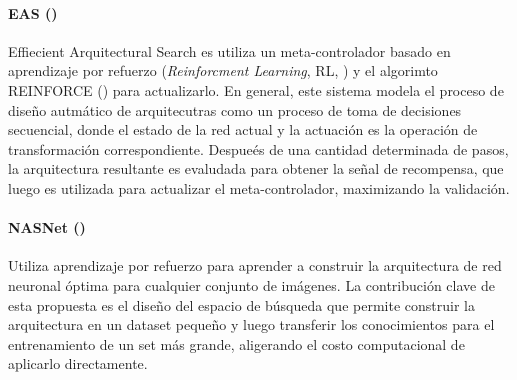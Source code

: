 
\paragraph*{EAS (\cite{cai2018efficient})} Effiecient Arquitectural Search es utiliza un meta-controlador basado en aprendizaje por refuerzo (\textit{Reinforcment Learning}, RL, \cite{kaelbling1996reinforcement}) y el algorimto REINFORCE (\cite{williams1992simple}) para actualizarlo. En general, este sistema modela el proceso de dise\~no autm\'atico de arquitecutras como un proceso de toma de decisiones secuencial, donde el estado de la red actual y la actuaci\'on es la operaci\'on de transformaci\'on correspondiente. Despue\'es de una cantidad determinada de pasos, la arquitectura resultante es evaludada para obtener la se\~nal de recompensa, que luego es utilizada para actualizar el meta-controlador, maximizando la validaci\'on.

        \paragraph*{NASNet (\cite{zoph2018learning})} Utiliza aprendizaje por refuerzo para aprender a construir la arquitectura de red neuronal \'optima para cualquier conjunto de im\'agenes. La contribuci\'on clave de esta propuesta es el diseño del espacio de b\'usqueda que permite construir la arquitectura en un dataset peque\~no y luego transferir los conocimientos para el entrenamiento de un set m\'as grande, aligerando el costo computacional de aplicarlo directamente.



